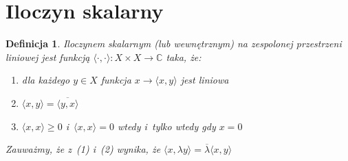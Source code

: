 \documentclass[11pt]{mwrep}
\renewcommand{\[}{\begin{equation}}
\renewcommand{\]}{\end{equation}}
\newcommand{\C}{{\ensuremath{\mathbb C}}}
\newtheorem{de}[subsection]{Definicja}
\newtheorem{ex}[subsection]{Przykład}
\newcounter{numer}
\begin{document}
\section{Iloczyn skalarny}
\begin{de}
	Iloczynem skalarnym (lub wewnętrznym)  na zespolonej przestrzeni liniowej jest funkcją $\langle \cdot, \cdot \rangle \colon X\times X \to\C$
	taka, że:
	\begin{enumerate}[(1)]
		\item dla każdego $y\in X$ funkcja $x \to \langle x,y \rangle$ jest liniowa
		\item $\langle x,y \rangle = \overline{\langle y,x \rangle}$
		\item $\langle x,x \rangle\ge 0$ i~$\langle x,x \rangle=0$ wtedy i~tylko wtedy gdy $x=0$ 
	\end{enumerate}
	Zauważmy, że z~(1) i~(2) wynika, że $\langle x,\lambda y \rangle = \overline{\lambda}\langle x,y \rangle$
\end{de}
\end{document}
